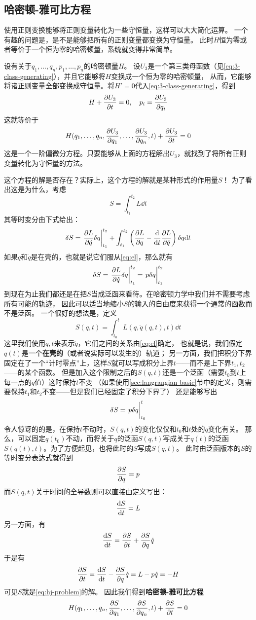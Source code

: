 \documentclass[UTF8, a4paper]{ctexart}
\begin{document}
\subsection{哈密顿-雅可比方程}

使用正则变换能够将正则变量转化为一些守恒量，这样可以大大简化运算。
一个有趣的问题是，是不是能够把所有的正则变量都变换为守恒量。
此时$H$恒为零或者等价于一个恒为零的哈密顿量，系统就变得非常简单。

设有关于$q_1, \ldots, q_n, p_1, \ldots, p
_n$的哈密顿量$H$。
设$U_3$是一个第三类母函数（见\eqref{eq:3-class-generating}），并且它能够将$H$变换成一个恒为零的哈密顿量，
从而，它能够将诸正则变量全部变换成守恒量。将$H'=0$代入\eqref{eq:3-class-generating}，得到
\[
    H + \pdv{U_3}{t} = 0, \quad p_i = \pdv{U_3}{q_i}
\]
这就等价于
\begin{equation}
    H(q_1, \ldots, q_n, \pdv{U_3}{q_1}, \ldots, \pdv{U_3}{q_n}, t) + \pdv{U_3}{t} = 0
    \label{eq:hj-problem}
\end{equation}
这是一个一阶偏微分方程。只要能够从上面的方程解出$U_3$，就找到了将所有正则变量转化为守恒量的方法。

这个方程的解是否存在？实际上，这个方程的解就是某种形式的作用量$S$！
为了看出这是为什么，考虑
\[
    S = \int_{t_1}^{t_2} L \dd t
\]
其等时变分由下式给出：
\[
    \delta S = \eval{\pdv{L}{\dot{q}} \delta q}_{t_1}^{t_2} + \int_{t_1}^{t_2} \left( \pdv{L}{q} - \dv{t} \pdv{L}{\dot{q}} \right) \delta q \dd t 
\]
如果$q$和$\dot{q}$是在壳的，也就是说它们服从\eqref{eq:el}，那么就有
\[
    \delta S = \eval{\pdv{L}{\dot{q}} \delta q}_{t_1}^{t_2} = \eval{p \delta q}_{t_1}^{t_2}
\]
到现在为止我们都还是在把$S$当成泛函来看待。在哈密顿力学中我们并不需要考虑所有可能的轨迹，
因此可以适当地缩小$S$的输入的自由度来获得一个通常的函数而不是泛函。
一个很好的想法是，定义
\[
    S(q, t) = \int_{t_0}^t L(q, \dot{q}(q,t), t) \dd t
\]
这里我们使用$q, t$来表示$\dot{q}$，它们之间的关系由\eqref{eq:el}确定，
也就是说，我们假定$q(t)$是一个\textbf{在壳的}（或者说实际可以发生的）轨道；
另一方面，我们把积分下界固定在了一个“计时零点”上，这样$S$就可以写成积分上界$t$——而不是上下界$t_1,t_2$——的某个函数。
但是加入这个限制之后的$S(q, t)$还是一个泛函（需要$t_0$到$t$上每一点的$q$值）这时保持$t$不变
（如果使用\ref{sec:langrangian-basic}节中的定义，则需要保持$t_1$和$t_2$不变——但是我们已经固定了积分下界了）
还是能够写出
\[
    \delta S = \eval{p \delta q}_{t_0}^t
\]
令人惊讶的的是，在保持$t$不动时，$S(q, t)$的变化仅仅和$t_0$和$t$处的$q$变化有关。
那么，可以固定$q(t_0)$不动，而将关于$q$的泛函$S(q,t)$写成关于$q(t)$的泛函$S(q(t),t)$。为了方便起见，也将此时的$S$写成$S(q,t)$。
此时由泛函版本的$S$的等时变分表达式就得到
\[
    \pdv{S}{q} = p
\]
而$S(q,t)$关于时间的全导数则可以直接由定义写出：
\[
    \dv{S}{t} = L
\]
另一方面，有
\[
    \dv{S}{t} = \pdv{S}{t} + \pdv{S}{q} \dot{q}
\]
于是有
\[
    \pdv{S}{t} = \dv{S}{t} - \pdv{S}{q} \dot{q} = L - p \dot{q} = -H
\]
可见$S$就是\eqref{eq:hj-problem}的解。
因此我们得到\textbf{哈密顿-雅可比方程}
\begin{equation}
    H(q_1, \ldots, q_n, \pdv{S}{q_1}, \ldots, \pdv{S}{q_n}, t) + \pdv{S}{t} = 0
    \label{eq:hj-eq}
\end{equation}
\end{document}
